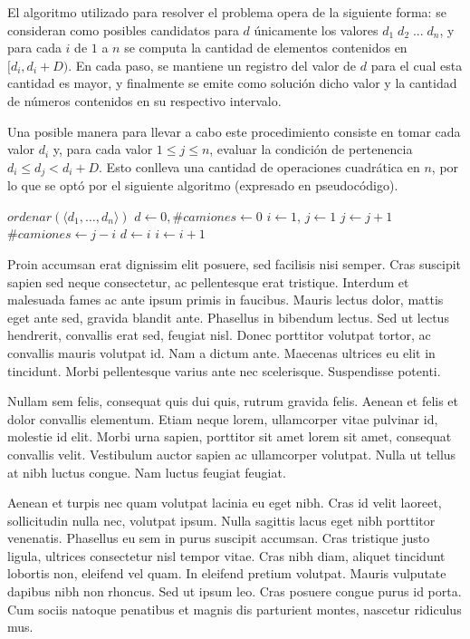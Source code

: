 El algoritmo utilizado para resolver el problema opera de la siguiente forma: se consideran como posibles candidatos para $d$ únicamente los valores $d_1\;d_2\;...\;d_n$, y para cada $i$ de $1$ a $n$ se computa la cantidad de elementos contenidos en $[d_i, d_i + D)$. En cada paso, se mantiene un registro del valor de $d$ para el cual esta cantidad es mayor, y finalmente se emite como solución dicho valor y la cantidad de números contenidos en su respectivo intervalo.

Una posible manera para llevar a cabo este procedimiento consiste en tomar cada valor $d_i$ y, para cada valor $1 \leq j \leq n$, evaluar la condición de pertenencia $d_i \leq d_j < d_i + D$. Esto conlleva una cantidad de operaciones cuadrática en $n$, por lo que se optó por el siguiente algoritmo (expresado en pseudocódigo).

\begin{pseudo}
        \State $ordenar(\langle d_1, \ldots, d_n \rangle)$ 
        \State $d \leftarrow 0, \#camiones \leftarrow 0$ 
        \State $i \leftarrow 1$, $j \leftarrow 1$ 
         
             
                \State $j \leftarrow j + 1$ 
            \EndWhile
             
                \State $\#camiones \leftarrow j - i$ 
                \State $d \leftarrow i$ 
            \EndIf
            \State $i \leftarrow i + 1$ 
        \EndWhile
    \EndProcedure
\end{pseudo}

Proin accumsan erat dignissim elit posuere, sed facilisis nisi semper. Cras suscipit sapien sed neque consectetur, ac pellentesque erat tristique. Interdum et malesuada fames ac ante ipsum primis in faucibus. Mauris lectus dolor, mattis eget ante sed, gravida blandit ante. Phasellus in bibendum lectus. Sed ut lectus hendrerit, convallis erat sed, feugiat nisl. Donec porttitor volutpat tortor, ac convallis mauris volutpat id. Nam a dictum ante. Maecenas ultrices eu elit in tincidunt. Morbi pellentesque varius ante nec scelerisque. Suspendisse potenti.

Nullam sem felis, consequat quis dui quis, rutrum gravida felis. Aenean et felis et dolor convallis elementum. Etiam neque lorem, ullamcorper vitae pulvinar id, molestie id elit. Morbi urna sapien, porttitor sit amet lorem sit amet, consequat convallis velit. Vestibulum auctor sapien ac ullamcorper volutpat. Nulla ut tellus at nibh luctus congue. Nam luctus feugiat feugiat.

Aenean et turpis nec quam volutpat lacinia eu eget nibh. Cras id velit laoreet, sollicitudin nulla nec, volutpat ipsum. Nulla sagittis lacus eget nibh porttitor venenatis. Phasellus eu sem in purus suscipit accumsan. Cras tristique justo ligula, ultrices consectetur nisl tempor vitae. Cras nibh diam, aliquet tincidunt lobortis non, eleifend vel quam. In eleifend pretium volutpat. Mauris vulputate dapibus nibh non rhoncus. Sed ut ipsum leo. Cras posuere congue purus id porta. Cum sociis natoque penatibus et magnis dis parturient montes, nascetur ridiculus mus.